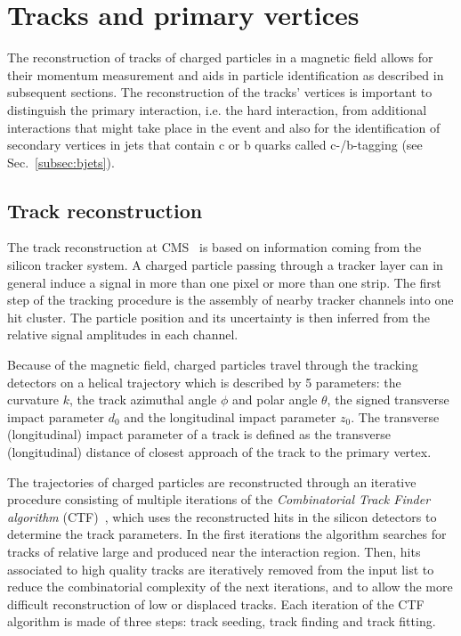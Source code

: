 \section{Tracks and primary vertices}\label{sec:tracksandvtx}

The reconstruction of tracks of charged particles in a magnetic field allows for their momentum measurement and aids in particle identification as described in subsequent sections. The reconstruction of the tracks' vertices is important to distinguish the primary interaction, i.e. the hard interaction, from additional interactions that might take place in the event and also for the identification of secondary vertices in jets that contain c or b quarks called c-/b-tagging (see Sec.~\ref{subsec:bjets}).

\subsection{Track reconstruction}\label{subsec:tracks}

The track reconstruction at CMS~\cite{Chatrchyan:2014fea} is based on information coming from the silicon tracker system. A charged particle passing through a tracker layer can in general induce a signal in more than one pixel or more than one strip. The first step of the tracking procedure is the assembly of nearby tracker channels into one hit cluster. The particle position and its uncertainty is then inferred from the relative signal amplitudes in each channel.

Because of the magnetic field, charged particles travel through the tracking detectors on a helical trajectory which is described by 5 parameters: the curvature $k$, the track azimuthal angle $\phi$ and polar angle $\theta$, the signed transverse impact parameter $d_0$ and the longitudinal impact parameter $z_0$. The transverse (longitudinal) impact parameter of a track is defined as the transverse (longitudinal) distance of closest approach of the track to the primary vertex.

The trajectories of charged particles are reconstructed through an iterative procedure consisting of multiple iterations of the \textit{Combinatorial Track Finder algorithm} (CTF)~\cite{Adam:934067}, which uses the reconstructed hits in the silicon detectors to determine the track parameters. In the first iterations the algorithm searches for tracks of relative large \pt and produced near the interaction region. Then, hits associated to high quality tracks are iteratively removed from the input list to reduce the combinatorial complexity of the next iterations, and to allow the more difficult reconstruction of low \pt or displaced tracks. Each iteration of the CTF algorithm is made of three steps: track seeding, track finding and track fitting.

